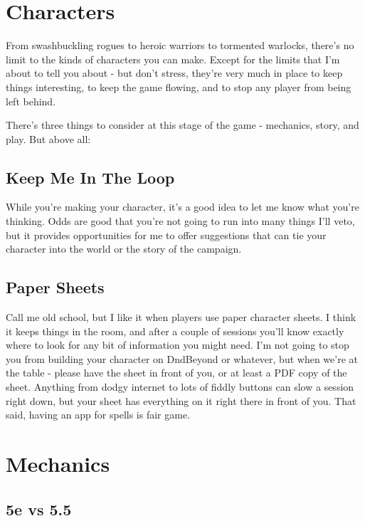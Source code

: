 \section {Characters}

From swashbuckling rogues to heroic warriors to tormented warlocks, there's no limit to the kinds of characters you can make. Except for the limits that I'm about to tell you about - but don't stress, they're very much in place to keep things interesting, to keep the game flowing, and to stop any player from being left behind.

There's three things to consider at this stage of the game - mechanics, story, and play. But above all:

\subsection {Keep Me In The Loop}

While you're making your character, it's a good idea to let me know what you're thinking. Odds are good that you're not going to run into many things I'll veto, but it provides opportunities for me to offer suggestions that can tie your character into the world or the story of the campaign.

\subsection {Paper Sheets}

Call me old school, but I like it when players use paper character sheets. I think it keeps things in the room, and after a couple of sessions you'll know exactly where to look for any bit of information you might need. I'm not going to stop you from building your character on DndBeyond or whatever, but when we're at the table - please have the sheet in front of you, or at least a PDF copy of the sheet. Anything from dodgy internet to lots of fiddly buttons can slow a session right down, but your sheet has everything on it right there in front of you. That said, having an app for spells is fair game.

\section {Mechanics}

\subsection {5e vs 5.5}

